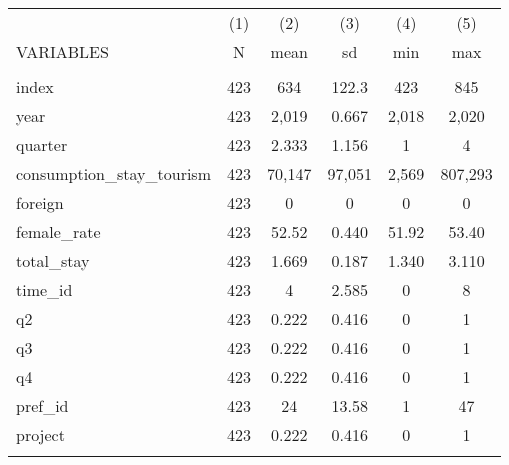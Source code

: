 \documentclass[]{article}
\begin{document}
\begin{tabular}{lccccc} \hline
 & (1) & (2) & (3) & (4) & (5) \\
VARIABLES & N & mean & sd & min & max \\ \hline
 &  &  &  &  &  \\
index & 423 & 634 & 122.3 & 423 & 845 \\
year & 423 & 2,019 & 0.667 & 2,018 & 2,020 \\
quarter & 423 & 2.333 & 1.156 & 1 & 4 \\
consumption\_stay\_tourism & 423 & 70,147 & 97,051 & 2,569 & 807,293 \\
foreign & 423 & 0 & 0 & 0 & 0 \\
female\_rate & 423 & 52.52 & 0.440 & 51.92 & 53.40 \\
total\_stay & 423 & 1.669 & 0.187 & 1.340 & 3.110 \\
time\_id & 423 & 4 & 2.585 & 0 & 8 \\
q2 & 423 & 0.222 & 0.416 & 0 & 1 \\
q3 & 423 & 0.222 & 0.416 & 0 & 1 \\
q4 & 423 & 0.222 & 0.416 & 0 & 1 \\
pref\_id & 423 & 24 & 13.58 & 1 & 47 \\
project & 423 & 0.222 & 0.416 & 0 & 1 \\
 &  &  &  &  &  \\ \hline
\end{tabular}
\end{document}
